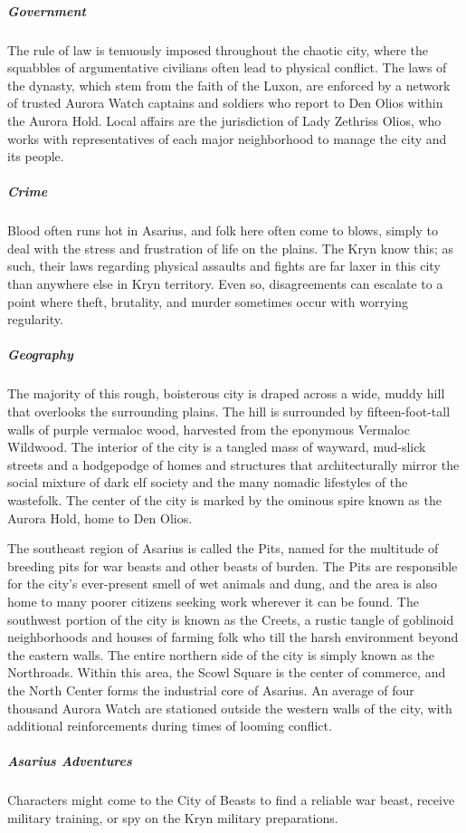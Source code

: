 \documentclass[10pt,a4paper,twoside,bg=print,twocolumn,openany,nodeprecatedcode]{dndbook}
\begin{document}
\subparagraph{Government}
The rule of law is tenuously imposed throughout the chaotic city, where the squabbles of argumentative civilians often lead to physical conflict. The laws of the dynasty, which stem from the faith of the Luxon, are enforced by a network of trusted Aurora Watch captains and soldiers who report to Den Olios within the Aurora Hold. Local affairs are the jurisdiction of Lady Zethriss Olios, who works with representatives of each major neighborhood to manage the city and its people.

\subparagraph{Crime}
Blood often runs hot in Asarius, and folk here often come to blows, simply to deal with the stress and frustration of life on the plains. The Kryn know this; as such, their laws regarding physical assaults and fights are far laxer in this city than anywhere else in Kryn territory. Even so, disagreements can escalate to a point where theft, brutality, and murder sometimes occur with worrying regularity.

\subparagraph{Geography}
The majority of this rough, boisterous city is draped across a wide, muddy hill that overlooks the surrounding plains. The hill is surrounded by fifteen-foot-tall walls of purple vermaloc wood, harvested from the eponymous Vermaloc Wildwood. The interior of the city is a tangled mass of wayward, mud-slick streets and a hodgepodge of homes and structures that architecturally mirror the social mixture of dark elf society and the many nomadic lifestyles of the wastefolk. The center of the city is marked by the ominous spire known as the Aurora Hold, home to Den Olios.

The southeast region of Asarius is called the Pits, named for the multitude of breeding pits for war beasts and other beasts of burden. The Pits are responsible for the city's ever-present smell of wet animals and dung, and the area is also home to many poorer citizens seeking work wherever it can be found. The southwest portion of the city is known as the Creets, a rustic tangle of goblinoid neighborhoods and houses of farming folk who till the harsh environment beyond the eastern walls. The entire northern side of the city is simply known as the Northroads. Within this area, the Scowl Square is the center of commerce, and the North Center forms the industrial core of Asarius. An average of four thousand Aurora Watch are stationed outside the western walls of the city, with additional reinforcements during times of looming conflict.

\subparagraph{Asarius Adventures}
Characters might come to the City of Beasts to find a reliable war beast, receive military training, or spy on the Kryn military preparations.
\end{document}
